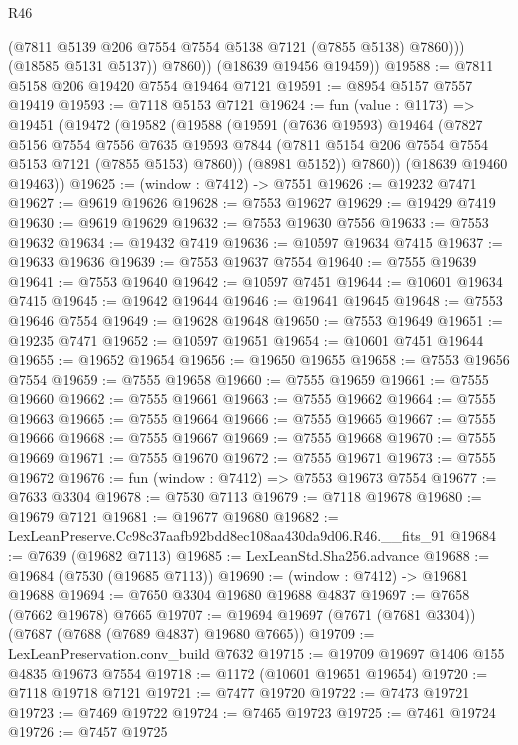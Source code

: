 \begin{lexlean}{R46}
\begin{coremodule}
                (@7811 @5139 @206 @7554 @7554 @5138 @7121 (@7855 @5138) @7860)))
            (@18585 @5131 @5137))
          @7860))
      (@18639 @19456 @19459))
@19588 := @7811 @5158 @206 @19420 @7554 @19464 @7121
@19591 := @8954 @5157 @7557 @19419
@19593 := @7118 @5153 @7121
@19624 := fun (value : @1173) =>
  @19451
    (@19472
      (@19582
        (@19588
          (@19591
            (@7636 @19593)
            @19464
            (@7827
              @5156
              @7554
              @7556
              @7635
              @19593
              @7844
              (@7811 @5154 @206 @7554 @7554 @5153 @7121 (@7855 @5153) @7860))
            (@8981 @5152))
          @7860))
      (@18639 @19460 @19463))
@19625 := (window : @7412) -> @7551
@19626 := @19232 @7471
@19627 := @9619 @19626
@19628 := @7553 @19627
@19629 := @19429 @7419
@19630 := @9619 @19629
@19632 := @7553 @19630 @7556
@19633 := @7553 @19632
@19634 := @19432 @7419
@19636 := @10597 @19634 @7415
@19637 := @19633 @19636
@19639 := @7553 @19637 @7554
@19640 := @7555 @19639
@19641 := @7553 @19640
@19642 := @10597 @7451
@19644 := @10601 @19634 @7415
@19645 := @19642 @19644
@19646 := @19641 @19645
@19648 := @7553 @19646 @7554
@19649 := @19628 @19648
@19650 := @7553 @19649
@19651 := @19235 @7471
@19652 := @10597 @19651
@19654 := @10601 @7451 @19644
@19655 := @19652 @19654
@19656 := @19650 @19655
@19658 := @7553 @19656 @7554
@19659 := @7555 @19658
@19660 := @7555 @19659
@19661 := @7555 @19660
@19662 := @7555 @19661
@19663 := @7555 @19662
@19664 := @7555 @19663
@19665 := @7555 @19664
@19666 := @7555 @19665
@19667 := @7555 @19666
@19668 := @7555 @19667
@19669 := @7555 @19668
@19670 := @7555 @19669
@19671 := @7555 @19670
@19672 := @7555 @19671
@19673 := @7555 @19672
@19676 := fun (window : @7412) => @7553 @19673 @7554
@19677 := @7633 @3304
@19678 := @7530 @7113
@19679 := @7118 @19678
@19680 := @19679 @7121
@19681 := @19677 @19680
@19682 := LexLeanPreserve.Cc98c37aafb92bdd8ec108aa430da9d06.R46.__fits_91
@19684 := @7639 (@19682 @7113)
@19685 := LexLeanStd.Sha256.advance
@19688 := @19684 (@7530 (@19685 @7113))
@19690 := (window : @7412) -> @19681 @19688
@19694 := @7650 @3304 @19680 @19688 @4837
@19697 := @7658 (@7662 @19678) @7665
@19707 := @19694 @19697 (@7671 (@7681 @3304)) (@7687 (@7688 (@7689 @4837) @19680 @7665))
@19709 := LexLeanPreservation.conv_build @7632
@19715 := @19709 @19697 @1406 @155 @4835 @19673 @7554
@19718 := @1172 (@10601 @19651 @19654)
@19720 := @7118 @19718 @7121
@19721 := @7477 @19720
@19722 := @7473 @19721
@19723 := @7469 @19722
@19724 := @7465 @19723
@19725 := @7461 @19724
@19726 := @7457 @19725

\end{coremodule}
\end{lexlean}
